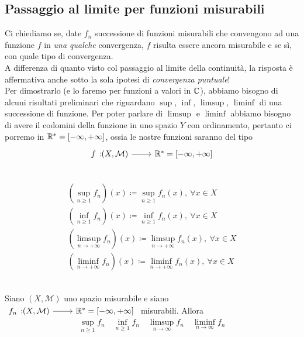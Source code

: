 \subsection{Passaggio al limite per funzioni misurabili}
Ci chiediamo se, date $f_n$ successione di funzioni misurabili che convengono ad una funzione $f$ in \textit{una qualche} convergenza, $f$ risulta essere ancora misurabile e se sì, con quale tipo di convergenza.\\
A differenza di quanto visto col passaggio al limite della continuità, la risposta è affermativa anche sotto la sola ipotesi di \textit{convergenza puntuale}!\\
Per dimostrarlo (e lo faremo per funzioni a valori in $\mathbb{C}$), abbiamo bisogno di alcuni risultati preliminari che riguardano $\sup$, $\inf$, $\limsup$, $\liminf$ di una successione di funzione. Per poter parlare di $\limsup$ e $\liminf$ abbiamo bisogno di avere il codomini della funzione in uno spazio $Y$ con ordinamento, pertanto ci porremo in  $\mathbb{R}^{\ast}=\left[-\infty,+\infty\right]$, ossia le nostre funzioni saranno del tipo
\begin{equation*}
\funz{f}{\left(X,\mathcal{M}\right)}{\realset^{\ast}=\left[-\infty,+\infty\right]}
\end{equation*}
\begin{define}~{}\\
\begin{gather*}
	\left(\sup_{n\geq 1} f_n\right)\left(x\right)\coloneqq \sup_{n\geq 1}f_n\left(x\right),\ \forall x\in X\\
	\left(\inf_{n\geq 1} f_n\right)\left(x\right)\coloneqq \inf_{n\geq 1}f_n\left(x\right),\ \forall x\in X\\
	\left(\limsup_{n\to+\infty} f_n\right)\left(x\right)\coloneqq \limsup_{n\to+\infty}f_n\left(x\right),\ \forall x\in X\\
	\left(\liminf_{n\to+\infty} f_n\right)\left(x\right)\coloneqq \liminf_{n\to+\infty}f_n\left(x\right),\ \forall x\in X
\end{gather*}
\end{define}
\begin{proposition}~{}\\
	Siano $ \left(X,\mathcal{M}\right)$ uno spazio misurabile e siano $\funz{f_n}{\left(X,\mathcal{M}\right)}{\realset^{\ast}=\left[-\infty,+\infty\right]}$ misurabili.
	Allora
	\begin{equation*}
		\sup_{n\geq 1} f_n\quad\inf_{n\geq 1} f_n\quad\limsup_{n\to\infty} f_n\quad\liminf_{n\to\infty} f_n
	\end{equation*}
\end{proposition}
